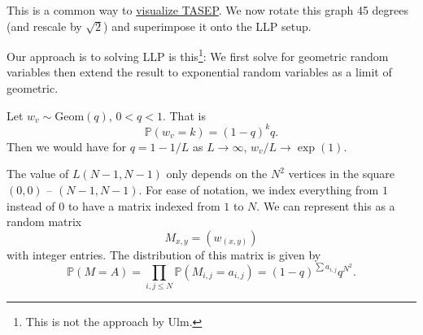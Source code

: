 This is a common way to \href{https://www.youtube.com/watch?v=QXBSxmL_Ric}{visualize TASEP}. 
We now rotate this graph 45 degrees (and rescale by $\sqrt{2}$) and superimpose it onto the LLP setup.


\begin{center}
    

\end{center}



Our approach is to solving LLP is this\footnote{This is not the approach by Ulm.}: We first solve for geometric random variables then extend the result to exponential random variables as a limit of geometric.

Let $w_v \sim \text{Geom}(q)$, $0< q< 1$. That is \[
\mathbb{P}(w_v=k) = (1-q)^{k} q.
\]
Then we would have for $q=1-1/L$ as $L\to \infty$, $w_v/L \to \exp(1)$.

The value of $L(N-1,N-1)$ only depends on the $N^2$ vertices in the square $(0,0)$ -- $(N-1,N-1)$. For ease of notation, we index everything from $1$ instead of $0$ to have a matrix indexed from $1$ to $N$. We can represent this as a random matrix \[
M_{x,y} = (w_{(x,y)})
\]
with integer entries. The distribution of this matrix is given by \[
\mathbb{P}(M=A) = \prod_{i,j\leq N} \mathbb{P}(M_{i,j} = a_{i,j}) = (1-q)^{\sum a_{i,j}} q^{N^2}.
\]

